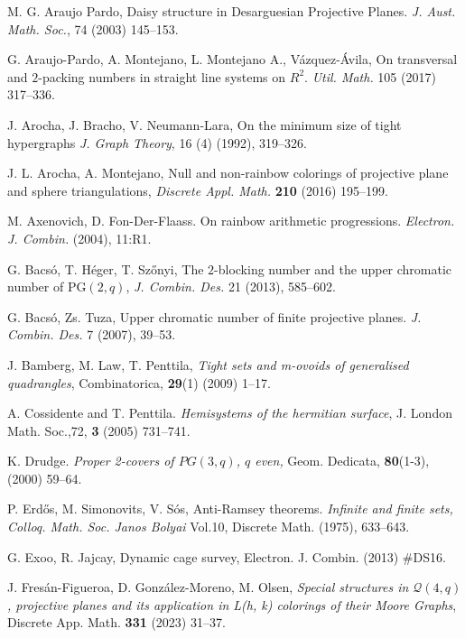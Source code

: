 \documentclass[12pt]{article}
\begin{document}
\begin{thebibliography}{}

 M. G. Araujo Pardo, Daisy structure in Desarguesian Projective Planes. \emph{J. Aust. Math. Soc.}, 74 (2003) 145--153. 

 G. Araujo-Pardo, A. Montejano, L. Montejano A., Vázquez-Ávila, On transversal and $2$-packing numbers in straight line systems on $R^2$. \emph{Util. Math.} 105 (2017) 317--336.

 J. Arocha, J. Bracho, V. Neumann-Lara, On the minimum size of tight hypergraphs
\emph{J. Graph Theory}, 16 (4) (1992), 319--326.

 J. L. Arocha, A. Montejano,  Null and non-rainbow colorings of projective plane and sphere triangulations, \emph{Discrete Appl. Math.} {\bf 210} (2016) 195--199.

 M. Axenovich, D. Fon-Der-Flaass. On rainbow arithmetic progressions. \emph{Electron. J. Combin.} (2004), 11:R1.

 G. Bacs\'{o}, T. H\'{e}ger, T. Sz\H{o}nyi,
The $2$-blocking number and the upper chromatic number of PG$(2,q)$, \emph{J. Combin. Des.} 21 (2013), 585--602.

 G. Bacs\'{o}, Zs. Tuza, Upper chromatic number of finite projective planes. \emph{J. Combin. Des.} 7 (2007), 39--53.

 J. Bamberg, M. Law, T. Penttila, \emph{Tight sets and m-ovoids of generalised quadrangles}, Combinatorica, {\bf29}(1) (2009) 1--17.

 A. Cossidente and T. Penttila. \emph{Hemisystems of the hermitian surface}, J. London Math. Soc.,{72}, {\bf3} (2005) 731--741.

 K. Drudge. \emph{Proper 2-covers of $PG(3,q)$, $q$ even,} Geom. Dedicata, {\bf80}(1-3), (2000) 59--64.

 P. Erd\H{o}s, M. Simonovits, V. S\'os,  Anti-Ramsey  theorems. \emph{Infinite and finite sets, Colloq. Math. Soc. Janos Bolyai} Vol.10, Discrete Math. (1975), 633--643.

 G. Exoo, R. Jajcay, {Dynamic cage survey}, {Electron. J. Combin.} (2013)  \#DS16.

 J. Fresán-Figueroa, D. González-Moreno, M. Olsen, \emph{Special structures in $\mathcal{Q}(4, q)$, projective planes and its application in L(h, k) colorings of their Moore Graphs}, Discrete App. Math. {\bf 331} (2023) 31--37.


\end{thebibliography}
\end{document}
